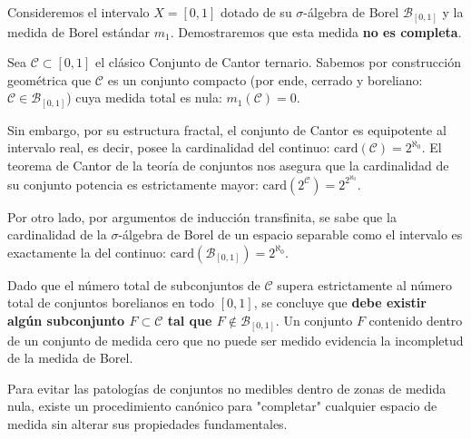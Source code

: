 \begin{observacion}
	Consideremos el intervalo $X = [0,1]$ dotado de su $\sigma$-álgebra de Borel $\mathcal{B}_{[0,1]}$ y la medida de Borel estándar $m_1$. Demostraremos que esta medida \textbf{no es completa}.
	
	Sea $\mathcal{C} \subset [0,1]$ el clásico Conjunto de Cantor ternario. Sabemos por construcción geométrica que $\mathcal{C}$ es un conjunto compacto (por ende, cerrado y boreliano: $\mathcal{C} \in \mathcal{B}_{[0,1]}$) cuya medida total es nula: $m_1(\mathcal{C}) = 0$. 
	
	Sin embargo, por su estructura fractal, el conjunto de Cantor es equipotente al intervalo real, es decir, posee la cardinalidad del continuo: $\text{card}(\mathcal{C}) = 2^{\aleph_0}$. El teorema de Cantor de la teoría de conjuntos nos asegura que la cardinalidad de su conjunto potencia es estrictamente mayor: $\text{card}(2^\mathcal{C}) = 2^{2^{\aleph_0}}$. 
	
	Por otro lado, por argumentos de inducción transfinita, se sabe que la cardinalidad de la $\sigma$-álgebra de Borel de un espacio separable como el intervalo es exactamente la del continuo: $\text{card}(\mathcal{B}_{[0,1]}) = 2^{\aleph_0}$. 
	
	Dado que el número total de subconjuntos de $\mathcal{C}$ supera estrictamente al número total de conjuntos borelianos en todo $[0,1]$, se concluye que \textbf{debe existir algún subconjunto $F \subset \mathcal{C}$ tal que $F \notin \mathcal{B}_{[0,1]}$}. Un conjunto $F$ contenido dentro de un conjunto de medida cero que no puede ser medido evidencia la incompletud de la medida de Borel.
\end{observacion}

Para evitar las patologías de conjuntos no medibles dentro de zonas de medida nula, existe un procedimiento canónico para "completar" cualquier espacio de medida sin alterar sus propiedades fundamentales.

